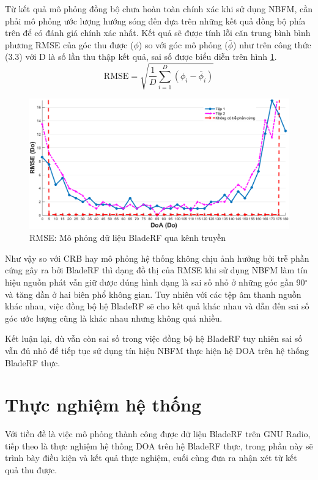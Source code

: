 Từ kết quả mô phỏng đồng bộ chưa hoàn toàn chính xác khi sử dụng NBFM, cần phải mô phỏng ước lượng hướng sóng đến dựa trên những kết quả đồng bộ phía trên để có đánh giá chính xác nhất. Kết quả sẽ được tính lỗi căn trung bình bình phương RMSE của góc thu được ($\phi$) so với góc mô phỏng ($\bar{\phi}$) như trên công thức (3.3) với D là số lần thu thập kết quả, sai số được biểu diễn trên hình \ref{fig:kqnbfm}.
\begin{equation}
	\mathrm{RMSE} = \sqrt{\frac{1}{D}\sum_{i=1}^{D}(\phi_i - \bar{\phi}_i)} 
\end{equation}

\begin{figure} [!ht]
	\centering
	\includegraphics[width=1\linewidth]{figures/kqnbfm.png}
	\caption{RMSE: Mô phỏng dữ liệu BladeRF qua kênh truyền}
	\label{fig:kqnbfm}
\end{figure}

Như vậy so với CRB hay mô phỏng hệ thống không chịu ảnh hưởng bởi trễ phần cứng gây ra bởi BladeRF thì dạng đồ thị của RMSE khi sử dụng NBFM làm tín hiệu nguồn phát vẫn giữ được đúng hình dạng là sai số nhỏ ở những góc gần 90$^{\circ}$ và tăng dần ở hai biên phổ không gian. Tuy nhiên với các tệp âm thanh nguồn khác nhau, việc đồng bộ hệ BladeRF sẽ cho kết quả khác nhau và dẫn đến sai số góc ước lượng cũng là khác nhau nhưng không quá nhiều.

Kết luận lại, dù vẫn còn sai số trong việc đồng bộ hệ BladeRF tuy nhiên sai số vẫn đủ nhỏ để tiếp tục sử dụng tín hiệu NBFM thực hiện hệ DOA trên hệ thống BladeRF thực.

\section{Thực nghiệm hệ thống}

Với tiền đề là việc mô phỏng thành công  được dữ liệu BladeRF trên GNU Radio, tiếp theo là thực nghiệm hệ thống DOA trên hệ BladeRF thực, trong phần này sẽ trình bày điều kiện và kết quả thực nghiệm, cuối cùng đưa ra nhận xét từ kết quả thu được.

